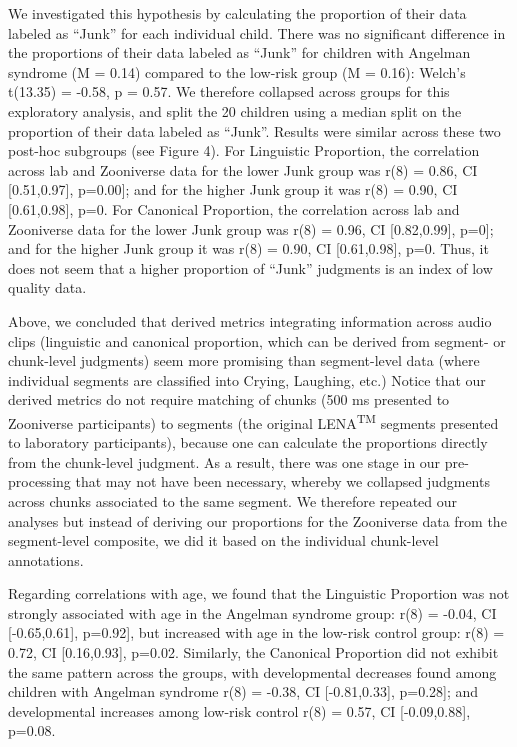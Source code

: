 \documentclass[english,,man]{apa6}
\begin{document}
We investigated this hypothesis by calculating the proportion of their data labeled as \enquote{Junk} for each individual child. There was no significant difference in the proportions of their data labeled as \enquote{Junk} for children with Angelman syndrome (M = 0.14) compared to the low-risk group (M = 0.16): Welch's t(13.35) = -0.58, p = 0.57. We therefore collapsed across groups for this exploratory analysis, and split the 20 children using a median split on the proportion of their data labeled as \enquote{Junk}. Results were similar across these two post-hoc subgroups (see Figure 4). For Linguistic Proportion, the correlation across lab and Zooniverse data for the lower Junk group was r(8) = 0.86, CI {[}0.51,0.97{]}, p=0.00{]}; and for the higher Junk group it was r(8) = 0.90, CI {[}0.61,0.98{]}, p=0. For Canonical Proportion, the correlation across lab and Zooniverse data for the lower Junk group was r(8) = 0.96, CI {[}0.82,0.99{]}, p=0{]}; and for the higher Junk group it was r(8) = 0.90, CI {[}0.61,0.98{]}, p=0. Thus, it does not seem that a higher proportion of \enquote{Junk} judgments is an index of low quality data.

Above, we concluded that derived metrics integrating information across audio clips (linguistic and canonical proportion, which can be derived from segment- or chunk-level judgments) seem more promising than segment-level data (where individual segments are classified into Crying, Laughing, etc.) Notice that our derived metrics do not require matching of chunks (500 ms presented to Zooniverse participants) to segments (the original LENA\textsuperscript{TM} segments presented to laboratory participants), because one can calculate the proportions directly from the chunk-level judgment. As a result, there was one stage in our pre-processing that may not have been necessary, whereby we collapsed judgments across chunks associated to the same segment. We therefore repeated our analyses but instead of deriving our proportions for the Zooniverse data from the segment-level composite, we did it based on the individual chunk-level annotations.

Regarding correlations with age, we found that the Linguistic Proportion was not strongly associated with age in the Angelman syndrome group: r(8) = -0.04, CI {[}-0.65,0.61{]}, p=0.92{]}, but increased with age in the low-risk control group: r(8) = 0.72, CI {[}0.16,0.93{]}, p=0.02. Similarly, the Canonical Proportion did not exhibit the same pattern across the groups, with developmental decreases found among children with Angelman syndrome r(8) = -0.38, CI {[}-0.81,0.33{]}, p=0.28{]}; and developmental increases among low-risk control r(8) = 0.57, CI {[}-0.09,0.88{]}, p=0.08.
\end{document}
